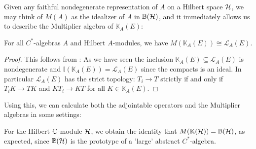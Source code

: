 Given any faithful nondegenerate representation of $A$ on a Hilbert space $\mathcal{H}$, we may think of $M(A)$ as the idealizer of $A$ in $\mathbb{B}(\mathcal{H})$, and it immediately allows us to describe the Multiplier algebra of $\mathbb{K}_A(E)$:
\begin{corollary}
	For all $C^*$-algebras $A$ and Hilbert $A$-modules, we have $M(\mathbb{K}_A(E))\cong \mathcal{L}_A(E)$.
\end{corollary}
\begin{proof}
	This follows from : As we have seen the inclusion $\mathbb{K}_A(E) \subseteq \mathcal{L}_A(E)$ is nondegenerate and $\mathbb{I}(\mathbb{K}_A(E))=\mathcal{L}_A(E)$ since the compacts is an ideal. In particular $\mathcal{L}_A(E)$ has the strict topology: $T_i \to T$ strictly if and only if $T_iK \to TK$ and $KT_i \to KT$ for all $K \in \mathbb{K}_A(E)$.
\end{proof}
Using this, we can calculate both the adjointable operators and the Multiplier algebras in some settings:
\begin{example}
	For the Hilbert $\mathbb{C}$-module $\mathcal{H}$, we obtain the identity that $M(\mathbb{K}(\mathcal{H})) = \mathbb{B}(\mathcal{H})$, as expected, since $\mathbb{B}(\mathcal{H})$ is the prototype of a 'large' abstract $C^*$-algebra.
\end{example}


